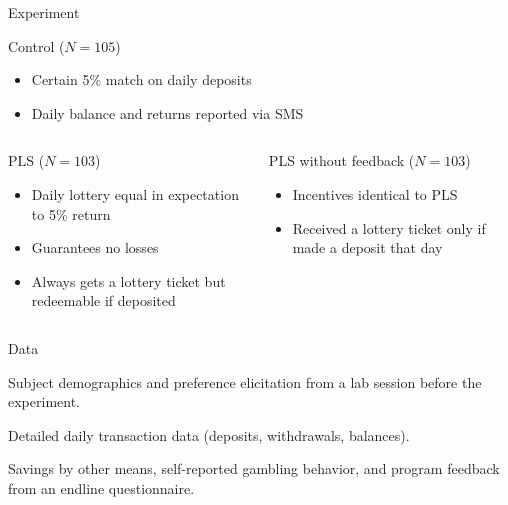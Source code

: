 \documentclass[aspectratio=169]{beamer}
\newenvironment{wideenumerate}{\enumerate\addtolength{\itemsep}{10pt}}{\endenumerate}
\begin{document}
\begin{frame}{Experiment}

	\begin{block}{Control ($N = 105$)}
		\begin{itemize}
		\item Certain 5\% match on daily deposits
		\item Daily balance and returns reported via SMS
		\end{itemize}
	\end{block}

	\begin{columns}[T]

		\begin{column}{0.48\textwidth}
			\begin{block}{PLS ($N = 103$)}
			\begin{itemize}
			\item Daily lottery equal in expectation to 5\% return
			\item Guarantees no losses
			\item Always gets a lottery ticket but redeemable if deposited
			\end{itemize}
			\end{block}
		\end{column}

		\begin{column}{0.48\textwidth}
			\begin{block}{PLS without feedback ($N = 103$)}
			\begin{itemize}
			\item Incentives identical to PLS
			\item Received a lottery ticket only if made a deposit that day
			\end{itemize}
			\end{block}
		\end{column}

	\end{columns}

\end{frame}

\begin{frame}{Data}

	\begin{wideenumerate}
		\item Subject demographics and preference elicitation from a lab session before the experiment.
		\item Detailed daily transaction data (deposits, withdrawals, balances).
		\item Savings by other means, self-reported gambling behavior, and program feedback from an endline questionnaire.
	\end{wideenumerate}

\end{frame}
\end{document}
